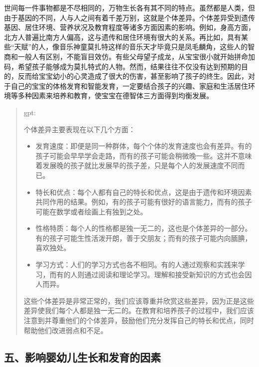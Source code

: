 \documentclass[
]{article}
\providecommand{\tightlist}{%
  \setlength{\itemsep}{0pt}\setlength{\parskip}{0pt}}
\begin{document}
世间每一件事物都是不尽相同的，万物生长各有其不同的特点。虽然都是人类，但由于基因的不同，人与人之间有着千差万别，这就是个体差异。个体差异受到遗传基因、居住环境、营养状况及教育程度等诸多方面因素的影响。例如，身高方面，北方人普遍比南方人偏高，这与遗传和居住环境有很大的关系。再比如，具有某些``天赋''的人，像音乐神童莫扎特这样的音乐天才毕竟只是凤毛麟角，这些人的智商和一般人有区别，不能盲目效仿。有些父母望子成龙，从宝宝很小就开始拼命加码，希望孩子能够成为莫扎特式的人物。然而，结果往往不仅没有达到预期的目的，反而给宝宝幼小的心灵造成了很大的伤害，甚至影响了孩子的终生。因此，对于自己的宝宝的体格发育和智能发育，一定要结合孩子的兴趣、家庭和生活居住环境等多种因素来培养和教育，使宝宝在德智体三方面得到均衡发展。

\begin{quote}
gpt:

个体差异主要表现在以下几个方面：

\begin{itemize}
\tightlist
\item
  发育速度：即便是同一种群体，每个个体的发育速度也会有差异。有的孩子可能会早早学会走路，而有的孩子可能会稍微晚一些。这并不意味着发展晚的孩子就比发展早的孩子差，只是每个人的发展速度不同而已。
\item
  特长和优点：每个人都有自己的特长和优点，这是由于遗传和环境因素共同作用的结果。例如，有的孩子可能有很好的语言能力，而有的孩子可能在数学或者绘画上有独到之处。
\item
  性格特质：每个人的性格都是独一无二的，这也是个体差异的一部分。有的孩子可能生性活泼开朗，善于交朋友；而有的孩子可能内向腼腆，喜欢独处。
\item
  学习方式：人们的学习方式也各不相同。有的人通过观察和实践来学习，而有的人则通过阅读和理论学习。理解和接受新知识的方式也会因人而异。
\end{itemize}

这些个体差异是非常正常的，我们应该尊重并欣赏这些差异，因为正是这些差异使我们每个人都是独一无二的。在教育和培养孩子的过程中，我们应该注意到并尊重他们的个体差异，鼓励他们充分发挥自己的特长和优点，同时帮助他们改进弱点和不足。
\end{quote}

\hypertarget{ux4e94ux5f71ux54cdux5a74ux5e7cux513fux751fux957fux548cux53d1ux80b2ux7684ux56e0ux7d20}{%
\subsection{五、影响婴幼儿生长和发育的因素}\label{ux4e94ux5f71ux54cdux5a74ux5e7cux513fux751fux957fux548cux53d1ux80b2ux7684ux56e0ux7d20}}
\end{document}
